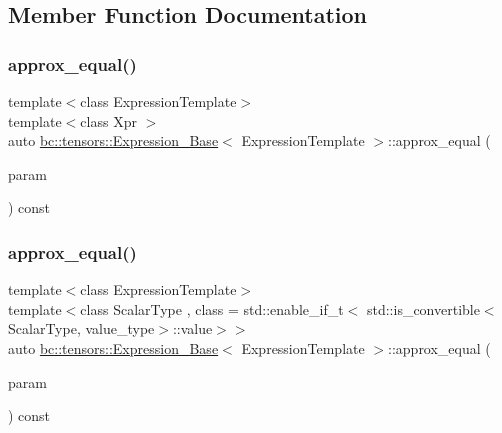 \subsection{Member Function Documentation}
\mbox{\label{classbc_1_1tensors_1_1Expression__Base_a50abb76e45904ee220fda2986c479faa}} 
\subsubsection{\texorpdfstring{approx\+\_\+equal()}{approx\_equal()}\hspace{0.1cm}{\footnotesize\ttfamily [1/2]}}
{\footnotesize\ttfamily template$<$class Expression\+Template$>$ \\
template$<$class Xpr $>$ \\
auto \hyperlink{classbc_1_1tensors_1_1Expression__Base}{bc\+::tensors\+::\+Expression\+\_\+\+Base}$<$ Expression\+Template $>$\+::approx\+\_\+equal (\begin{DoxyParamCaption}\item[{const \hyperlink{classbc_1_1tensors_1_1Expression__Base}{Expression\+\_\+\+Base}$<$ Xpr $>$ \&}]{param }\end{DoxyParamCaption}) const\hspace{0.3cm}{\ttfamily [inline]}}

\mbox{\label{classbc_1_1tensors_1_1Expression__Base_afa5557035b5b4021c14b688ac93cbe75}} 
\subsubsection{\texorpdfstring{approx\+\_\+equal()}{approx\_equal()}\hspace{0.1cm}{\footnotesize\ttfamily [2/2]}}
{\footnotesize\ttfamily template$<$class Expression\+Template$>$ \\
template$<$class Scalar\+Type , class  = std\+::enable\+\_\+if\+\_\+t$<$   std\+::is\+\_\+convertible$<$\+Scalar\+Type, value\+\_\+type$>$\+::value$>$$>$ \\
auto \hyperlink{classbc_1_1tensors_1_1Expression__Base}{bc\+::tensors\+::\+Expression\+\_\+\+Base}$<$ Expression\+Template $>$\+::approx\+\_\+equal (\begin{DoxyParamCaption}\item[{const Scalar\+Type \&}]{param }\end{DoxyParamCaption}) const\hspace{0.3cm}{\ttfamily [inline]}}

